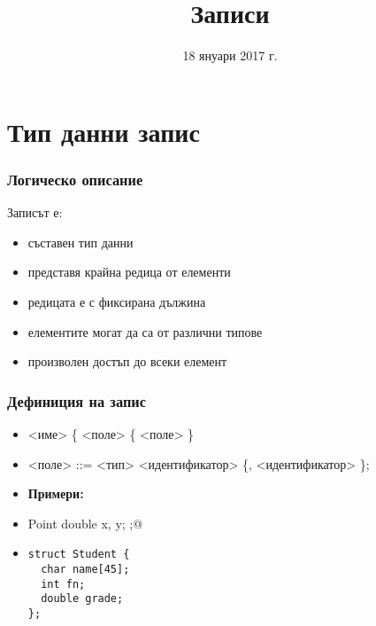 \documentclass{beamer}
\title{Записи}
\date{18 януари 2017 г.}
\begin{document}
\begin{frame}
  \titlepage
\end{frame}

\section{Тип данни запис}


\begin{frame}
  \frametitle{Логическо описание}

Записът е:
\begin{itemize}[<+->]
\item съставен тип данни
\item представя крайна редица от елементи
\item редицата е с \alert<6>{фиксирана дължина}
\item елементите могат да са от \alert<6>{различни типове}
\item произволен достъп до всеки елемент
\end{itemize}
\end{frame}

\begin{frame}[fragile]
  \frametitle{Дефиниция на запис}

  \begin{itemize}[<+->]
  \item {}<име> \tta\{ <поле> \{ <поле> \} \tta{\};}
  \item{} <поле> ::= <тип> <идентификатор> \{\tta, <идентификатор> \}\tta;
  \item \textbf{Примери:}
  \item \lst@struct Point { double x, y; };@
  \item
\begin{lstlisting}
struct Student {
  char name[45];
  int fn;
  double grade;
};
\end{lstlisting}
  \end{itemize}
\end{frame}
\end{document}
